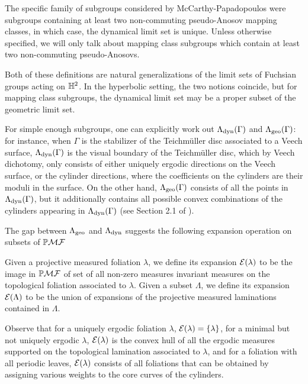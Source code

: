 \documentclass[12pt, reqno]{amsart}
\begin{document}
\begin{remark}
  The specific family of subgroups considered by McCarthy-Papadopoulos were subgroups containing at least two non-commuting pseudo-Anosov mapping classes, in which case, the dynamical limit set is unique.
  Unless otherwise specified, we will only talk about mapping class subgroups which contain at least two non-commuting pseudo-Anosovs.
\end{remark}

Both of these definitions are natural generalizations of the limit sets of Fuchsian groups acting on $\mathbb{H}^2$.
In the hyperbolic setting, the two notions coincide, but for mapping class subgroups, the dynamical limit set may be a proper subset of the geometric limit set.

For simple enough subgroups, one can explicitly work out $\Lambda_{\mathrm{dyn}}(\Gamma)$ and $\Lambda_{\mathrm{geo}}(\Gamma)$: for instance, when $\Gamma$ is the stabilizer of the Teichmüller disc associated to a Veech surface, $\Lambda_{\mathrm{dyn}}(\Gamma)$ is the visual boundary of the Teichmüller disc, which by Veech dichotomy, only consists of either uniquely ergodic directions on the Veech surface, or the cylinder directions, where the coefficients on the cylinders are their moduli in the surface.
On the other hand, $\Lambda_{\mathrm{geo}}(\Gamma)$ consists of all the points in $\Lambda_{\mathrm{dyn}}(\Gamma)$, but it additionally contains all possible convex combinations of the cylinders appearing in $\Lambda_{\mathrm{dyn}}(\Gamma)$ (see Section 2.1 of \cite{2007math......2034K}).

The gap between $\Lambda_{\mathrm{geo}}$ and $\Lambda_{\mathrm{dyn}}$ suggests the following expansion operation on subsets of $\mathbb{P}\mathcal{MF}$
\begin{definition}[Expansion]
  Given a projective measured foliation $\lambda$, we define its expansion $\mathcal{E}(\lambda)$ to be the image in $\mathbb{P}\mathcal{MF}$ of set of all non-zero measures invariant measures on the topological foliation associated to $\lambda$.
  Given a subset $\Lambda$, we define its expansion $\mathcal{E}(\Lambda)$ to be the union of expansions of the projective measured laminations contained in $\Lambda$.
\end{definition}
Observe that for a uniquely ergodic foliation $\lambda$, $\mathcal{E}(\lambda) = \{\lambda\}$, for a minimal but not uniquely ergodic $\lambda$, $\mathcal{E}(\lambda)$ is the convex hull of all the ergodic measures supported on the topological lamination associated to $\lambda$, and for a foliation with all periodic leaves, $\mathcal{E}(\lambda)$ consists of all foliations that can be obtained by assigning various weights to the core curves of the cylinders.
\end{document}

